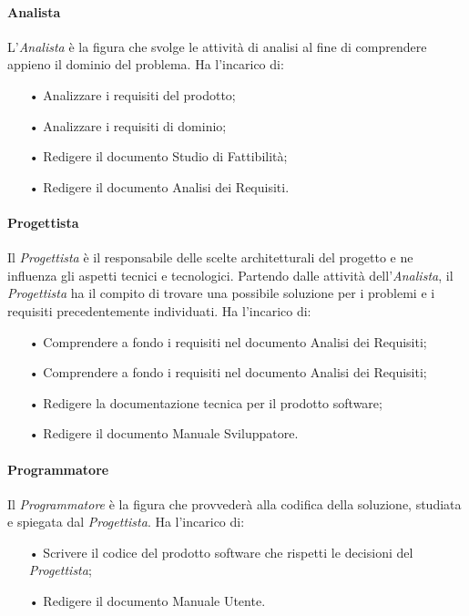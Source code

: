 \paragraph{Analista}
L'\textit{Analista} è la figura che svolge le attività di analisi al fine di comprendere appieno il dominio del problema.  
\newline
Ha l’incarico di:
\begin{itemize}
\item[•] Analizzare i requisiti del prodotto;
\item[•] Analizzare i requisiti di dominio;
\item[•] Redigere il documento Studio di Fattibilità;
\item[•] Redigere il documento Analisi dei Requisiti.
\end{itemize}

\paragraph{Progettista}
Il \textit{Progettista} è il responsabile delle scelte architetturali del progetto e ne influenza gli aspetti tecnici e tecnologici.  
\newline
Partendo dalle attività dell'\textit{Analista}, il \textit{Progettista} ha il compito di trovare una possibile soluzione per i problemi e i requisiti precedentemente individuati. 
\newline
Ha l’incarico di:
\begin{itemize}
\item[•] Comprendere a fondo i requisiti nel documento Analisi dei Requisiti;
\item[•] Comprendere a fondo i requisiti nel documento Analisi dei Requisiti;
\item[•] Redigere la documentazione tecnica per il prodotto software;
\item[•] Redigere il documento Manuale Sviluppatore.
\end{itemize}

\paragraph{Programmatore}
Il \textit{Programmatore} è la figura che provvederà alla codifica della soluzione, studiata e spiegata dal \textit{Progettista}.  
\newline
Ha l'incarico di:
\begin{itemize}
\item[•] Scrivere il codice del prodotto software che rispetti le decisioni del \textit{Progettista};
\item[•] Redigere il documento Manuale Utente.
\end{itemize}

